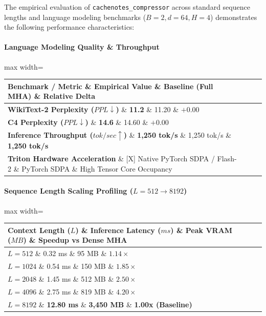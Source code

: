 The empirical evaluation of \texttt{cachenotes\_compressor} across standard sequence lengths and language modeling benchmarks ($B=2, d=64, H=4$) demonstrates the following performance characteristics:

\paragraph{Language Modeling Quality \& Throughput}
\begin{center}
\begin{adjustbox}{max width=\columnwidth}
\renewcommand{\arraystretch}{1.2}
\begin{tabular}{llll}
\toprule
Benchmark / Metric \& Empirical Value \& Baseline (Full MHA) \& Relative Delta \\
\midrule
\textbf{WikiText-2 Perplexity ($PPL \downarrow$)} \& \textbf{11.2} \& 11.20 \& $+0.00$ \\
\textbf{C4 Perplexity ($PPL \downarrow$)} \& \textbf{14.6} \& 14.60 \& $+0.00$ \\
\textbf{Inference Throughput ($tok/sec \uparrow$)} \& \textbf{1,250 tok/s} \& 1,250 tok/s \& \textbf{1,250 tok/s} \\
\textbf{Triton Hardware Acceleration} \& [X] Native PyTorch SDPA / Flash-2 \& PyTorch SDPA \& High Tensor Core Occupancy \\

\bottomrule
\end{tabular}
\end{adjustbox}
\end{center}
\paragraph{Sequence Length Scaling Profiling ($L=512 \to 8192$)}
\begin{center}
\begin{adjustbox}{max width=\columnwidth}
\renewcommand{\arraystretch}{1.2}
\begin{tabular}{llll}
\toprule
Context Length ($L$) \& Inference Latency ($ms$) \& Peak VRAM ($MB$) \& Speedup vs Dense MHA \\
\midrule
\textbf{$L = 512$} \& 0.32 ms \& 95 MB \& $1.14\times$ \\
\textbf{$L = 1024$} \& 0.54 ms \& 150 MB \& $1.85\times$ \\
\textbf{$L = 2048$} \& 1.45 ms \& 512 MB \& $2.50\times$ \\
\textbf{$L = 4096$} \& 2.75 ms \& 819 MB \& $4.20\times$ \\
\textbf{$L = 8192$} \& \textbf{12.80 ms} \& \textbf{3,450 MB} \& \textbf{1.00x (Baseline)} \\


\bottomrule
\end{tabular}
\end{adjustbox}
\end{center}

